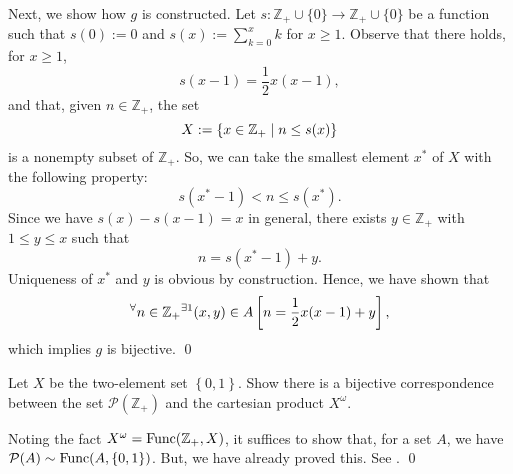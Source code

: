 \documentclass[a4paper,12pt]{article}
\begin{document}
\begin{sol}
	Next, we show how \( g \) is constructed.
	Let
	\( s:\mathbb{Z}_{+}\cup\{0\} \to \mathbb{Z}_{+}\cup\{0\} \)
	be a function such that
	\( s(0):=0 \)
	and
	\( s(x):=\sum_{k=0}^{x}k \)
	for
	\( x \ge 1 \).
	Observe that there holds, for \( x \ge 1 \),
	\begin{equation*}
		s(x-1) = \frac{1}{2}x(x-1),
	\end{equation*}
	and that, given \( n\in \mathbb{Z}_{+} \), the set
	\begin{equation*}
		X:=\left\{  x \in \mathbb{Z}_{+} \;|\; n \le s(x) \right\}
	\end{equation*}
	is a nonempty subset of \( \mathbb{Z}_{+} \).
	So, we can take the smallest element \( x^{\ast} \) of \( X \)
	with the following property:
	\begin{equation*}
		s(x^{\ast} - 1) < n \le  s(x^{\ast}).
	\end{equation*}
	Since we have \( s(x)-s(x-1)=x \) in general,
	there exists \( y \in \mathbb{Z}_{+} \) with \( 1 \le y \le x \)
	such that
	\begin{equation*}
		n=s(x^{\ast} - 1)+y.
	\end{equation*}
	Uniqueness of \( x^{\ast} \) and \( y \) is obvious by construction.
	Hence, we have shown that
	\begin{equation*}
		{}^{\forall}  n \in \mathbb{Z}_{+}
		{}^{\exists 1} (x,y)\in A
		\left[ n=\frac{1}{2}x(x-1)+y \right],
	\end{equation*}
	which implies
	\( g \)
	is bijective.
	\qed\end{sol}

\begin{exe}
	Let \( X \) be the two-element set \( \left\{ 0,1 \right\} \).
	Show there is a bijective correspondence between the set
	\( \mathcal{P}(\mathbb{Z}_{+}) \)
	and the cartesian product \( X^{\omega} \).
\end{exe}\begin{sol}
	Noting the fact \( X^{\omega} = \mathrm{Func}(\mathbb{Z}_{+},X) \),
	it suffices to show that, for a set \( A \), we have
	\( \mathcal{P}(A) \sim \mathrm{Func}(A,\left\{ 0,1 \right\})\).
	But, we have already proved this.
	See .
	\qed\end{sol}
\end{document}

